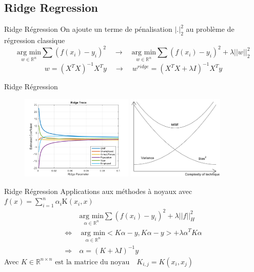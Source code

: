 \documentclass{beamer}
\begin{document}
\subsection{Ridge Regression}
\begin{frame}{Ridge Régression}
On ajoute un terme de pénalisation $|.|_2^2$ au problème de régression classique
\[
\underset{w \in \mathbb{R}^{n}}{\text{arg min}}\sum{(f(x_i) - y_i)^{2}} \quad \rightarrow \quad \underset{w \in \mathbb{R}^{n}}{\text{arg min}}\sum{(f(x_i) - y_i)^{2}} +  \lambda ||w||_2^{2}
\]
\[
w = (X^T X)^{-1} X^T y\quad \rightarrow \quad w^{ridge} = (X^T X + \lambda I)^{-1} X^T y
\]
\end{frame}
\begin{frame}{Ridge Régression}

\begin{figure}[!h]
	\begin{center}
	\centering	
		\includegraphics[height =4cm, keepaspectratio]{graphes/ridge.png}
		\includegraphics[height =4cm, keepaspectratio]{graphes/ridge_trade.png}
	\end{center}
\end{figure}
\end{frame}
\begin{frame}{Ridge Régression}
Applications aux méthodes à noyaux avec $f(x) = \sum_{i = 1}^{n}{\alpha_i \text{K}(x_i , x)}$
\[
\begin{aligned}
&\underset{\alpha \in \mathbb{R}^{n}}{\text{arg min}}\sum{(f(x_i) - y_i)^{2}} +  \lambda ||f||_H^{2} \\
\Leftrightarrow
& \ \underset{\alpha \in \mathbb{R}^{n}}{\text{arg min}}<K \alpha - y , K 	\alpha -y > + \lambda \alpha^{T} K \alpha \\
\Rightarrow \ & \alpha	=(K + \lambda I)^{-1}y
\end{aligned}
\]
Avec $K \in \mathbb{R}^{n \times n} \text{ est la matrice du 			noyau} \quad K_{i,j} = K(x_i, x_j)$
\end{frame}
\end{document}
